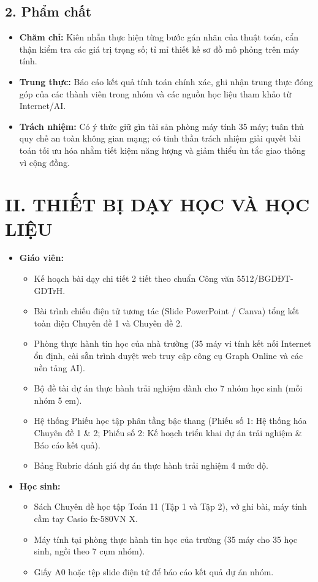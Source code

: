 \documentclass[12pt, a4paper]{article}
\begin{document}
\subsection*{2. Phẩm chất}

\begin{itemize}[leftmargin=1.2cm]
    \item \textbf{Chăm chỉ:} Kiên nhẫn thực hiện từng bước gán nhãn của thuật toán, cẩn thận kiểm tra các giá trị trọng số; tỉ mỉ thiết kế sơ đồ mô phỏng trên máy tính.
    \item \textbf{Trung thực:} Báo cáo kết quả tính toán chính xác, ghi nhận trung thực đóng góp của các thành viên trong nhóm và các nguồn học liệu tham khảo từ Internet/AI.
    \item \textbf{Trách nhiệm:} Có ý thức giữ gìn tài sản phòng máy tính 35 máy; tuân thủ quy chế an toàn không gian mạng; có tinh thần trách nhiệm giải quyết bài toán tối ưu hóa nhằm tiết kiệm năng lượng và giảm thiểu ùn tắc giao thông vì cộng đồng.
\end{itemize}

\section*{II. THIẾT BỊ DẠY HỌC VÀ HỌC LIỆU}

\begin{itemize}[leftmargin=1.2cm]
    \item \textbf{Giáo viên:}
    \begin{itemize}[leftmargin=0.6cm]
        \item Kế hoạch bài dạy chi tiết 2 tiết theo chuẩn Công văn 5512/BGDĐT-GDTrH.
        \item Bài trình chiếu điện tử tương tác (Slide PowerPoint / Canva) tổng kết toàn diện Chuyên đề 1 và Chuyên đề 2.
        \item Phòng thực hành tin học của nhà trường (35 máy vi tính kết nối Internet ổn định, cài sẵn trình duyệt web truy cập công cụ Graph Online và các nền tảng AI).
        \item Bộ đề tài dự án thực hành trải nghiệm dành cho 7 nhóm học sinh (mỗi nhóm 5 em).
        \item Hệ thống Phiếu học tập phân tầng bậc thang (Phiếu số 1: Hệ thống hóa Chuyên đề 1 \& 2; Phiếu số 2: Kế hoạch triển khai dự án trải nghiệm \& Báo cáo kết quả).
        \item Bảng Rubric đánh giá dự án thực hành trải nghiệm 4 mức độ.
    \end{itemize}
    \item \textbf{Học sinh:}
    \begin{itemize}[leftmargin=0.6cm]
        \item Sách Chuyên đề học tập Toán 11 (Tập 1 và Tập 2), vở ghi bài, máy tính cầm tay Casio fx-580VN X.
        \item Máy tính tại phòng thực hành tin học của trường (35 máy cho 35 học sinh, ngồi theo 7 cụm nhóm).
        \item Giấy A0 hoặc tệp slide điện tử để báo cáo kết quả dự án nhóm.
    \end{itemize}
\end{itemize}
\end{document}
